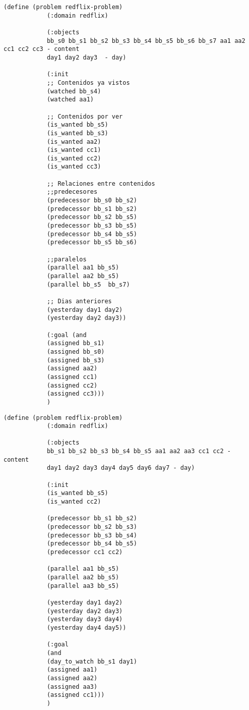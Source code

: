 \documentclass[a4paper]{article}
\begin{document}
	
	\noindent
	\begin{minipage}[t]{0.45\textwidth}
		\begin{lstlisting}[language=PDDL, caption={Joc de Prova 1 - Extensió 3}, label={lst:JP13}]                     
			(define (problem redflix-problem)
			(:domain redflix)
			
			(:objects
			bb_s0 bb_s1 bb_s2 bb_s3 bb_s4 bb_s5 bb_s6 bb_s7 aa1 aa2 cc1 cc2 cc3 - content
			day1 day2 day3  - day)
			
			(:init
			;; Contenidos ya vistos
			(watched bb_s4)
			(watched aa1)
			
			;; Contenidos por ver
			(is_wanted bb_s5)
			(is_wanted bb_s3)
			(is_wanted aa2)
			(is_wanted cc1)
			(is_wanted cc2)
			(is_wanted cc3)
			
			;; Relaciones entre contenidos
			;;predecesores
			(predecessor bb_s0 bb_s2)
			(predecessor bb_s1 bb_s2)
			(predecessor bb_s2 bb_s5)
			(predecessor bb_s3 bb_s5)
			(predecessor bb_s4 bb_s5)
			(predecessor bb_s5 bb_s6)
			
			;;paralelos
			(parallel aa1 bb_s5)
			(parallel aa2 bb_s5)
			(parallel bb_s5  bb_s7)
			
			;; Dias anteriores
			(yesterday day1 day2)
			(yesterday day2 day3))
			
			(:goal (and
			(assigned bb_s1)
			(assigned bb_s0)
			(assigned bb_s3)
			(assigned aa2)
			(assigned cc1)
			(assigned cc2)
			(assigned cc3)))
			)	
		\end{lstlisting}
		
	\end{minipage}
	\hfill
	\begin{minipage}[t]{0.45\textwidth}
		\begin{lstlisting}[language=PDDL, caption={Joc de Prova 2 - Extensió 3}, label={lst:JP23}]                    (define (problem redflix-problem)
			(:domain redflix)
			
			(:objects
			bb_s1 bb_s2 bb_s3 bb_s4 bb_s5 aa1 aa2 aa3 cc1 cc2 - content
			day1 day2 day3 day4 day5 day6 day7 - day)
			
			(:init
			(is_wanted bb_s5)
			(is_wanted cc2)
			
			(predecessor bb_s1 bb_s2)
			(predecessor bb_s2 bb_s3)
			(predecessor bb_s3 bb_s4)
			(predecessor bb_s4 bb_s5)
			(predecessor cc1 cc2)
			
			(parallel aa1 bb_s5)
			(parallel aa2 bb_s5)
			(parallel aa3 bb_s5)
			
			(yesterday day1 day2)
			(yesterday day2 day3)
			(yesterday day3 day4)
			(yesterday day4 day5))
			
			(:goal
			(and
			(day_to_watch bb_s1 day1)
			(assigned aa1)
			(assigned aa2)
			(assigned aa3)
			(assigned cc1)))
			)	
		\end{lstlisting}
	\end{minipage}
	
\end{document}
